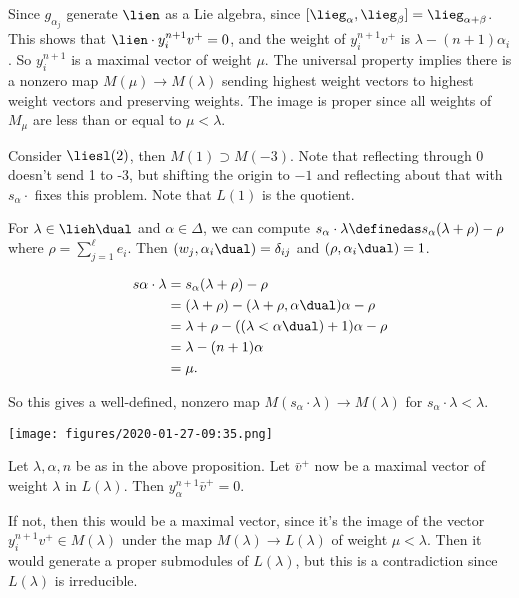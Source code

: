 \begin{description}
Since \(g_{\alpha_j}\) generate \(\lien\) as a Lie algebra, since
\([\lieg_\alpha, \lieg_\beta] = \lieg_{\alpha + \beta}\). This shows
that \(\lien \cdot y_i^{n+1} v^+ = 0\), and the weight of
\(y_i^{n+1} v^+\) is \(\lambda - (n+1)\alpha_i\). So \(y_i^{n+1}\) is a
maximal vector of weight \(\mu\). The universal property implies there
is a nonzero map \(M(\mu) \to M(\lambda)\) sending highest weight
vectors to highest weight vectors and preserving weights. The image is
proper since all weights of \(M_\mu\) are less than or equal to
\(\mu < \lambda\).
\end{description}

Consider \(\liesl(2)\), then \(M(1) \supset M(-3)\). Note that
reflecting through 0 doesn't send 1 to -3, but shifting the origin to
\(-1\) and reflecting about that with \(s_\alpha \cdot\) fixes this
problem. Note that \(L(1)\) is the quotient.

For \(\lambda \in \lieh\dual\) and \(\alpha \in \Delta\), we can compute
\(s_\alpha \cdot \lambda \definedas s_\alpha(\lambda + \rho) - \rho\)
where \(\rho = \sum_{j=1}^\ell e_i\). Then
\((w_j, \alpha_i\dual) = \delta_{ij}\) and
\((\rho, \alpha_i\dual) = 1\).

\begin{align*}
s\alpha \cdot \lambda 
&= s_\alpha(\lambda + \rho) - \rho \\
&= (\lambda + \rho) - (\lambda + \rho, \alpha\dual)\alpha -\rho \\
&= \lambda + \rho - ((\lambda< \alpha\dual) +1)\alpha - \rho \\
&= \lambda - (n+1)\alpha \\
&= \mu
.\end{align*}

So this gives a well-defined, nonzero map
\(M(s_\alpha \cdot \lambda) \to M(\lambda)\) for
\(s_\alpha \cdot \lambda < \lambda\).

\texttt{[image: figures/2020-01-27-09:35.png]}\\

\begin{description}
\tightlist
\item[Corollary]
Let \(\lambda, \alpha, n\) be as in the above proposition. Let
\(\bar v^+\) now be a maximal vector of weight \(\lambda\) in
\(L(\lambda)\). Then \(y_\alpha^{n+1} \bar v^+ = 0\).
\item[Proof]
If not, then this would be a maximal vector, since it's the image of the
vector \(y_i^{n+1}v^+ \in M(\lambda)\) under the map
\(M(\lambda) \to L(\lambda)\) of weight \(\mu < \lambda\). Then it would
generate a proper submodules of \(L(\lambda)\), but this is a
contradiction since \(L(\lambda)\) is irreducible.
\end{description}

